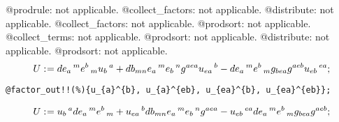 \documentclass[11pt]{article}
\def\specialcolon{\mathrel{\mathop{:}}\hspace{-.5em}}
\begin{document}
@prodrule: not applicable.
@collect\_factors: not applicable.
@distribute: not applicable.
@collect\_factors: not applicable.
@prodsort: not applicable.
@collect\_terms: not applicable.
@prodsort: not applicable.
@distribute: not applicable.
@prodsort: not applicable.
\begin{dmath*}[compact, spread=2pt]
U\specialcolon{}= {de}_{a}\,^{m} {e}^{b}\,_{m} {u}_{b}\,^{a} + {db}_{m n} {e}_{a}\,^{m} {e}_{b}\,^{n} {g}^{a ea} {u}_{ea}\,^{b} - {de}_{a}\,^{m} {e}^{b}\,_{m} {g}_{b ea} {g}^{a eb} {u}_{eb}\,^{ea};
\end{dmath*}
{\color[named]{Blue}\begin{verbatim}
@factor_out!!(%){u_{a}^{b}, u_{a}^{eb}, u_{ea}^{b}, u_{ea}^{eb}};
\end{verbatim}}
\begin{dmath*}[compact, spread=2pt]
U\specialcolon{}= {u}_{b}\,^{a} {de}_{a}\,^{m} {e}^{b}\,_{m} + {u}_{ea}\,^{b} {db}_{m n} {e}_{a}\,^{m} {e}_{b}\,^{n} {g}^{a ea} - {u}_{eb}\,^{ea} {de}_{a}\,^{m} {e}^{b}\,_{m} {g}_{b ea} {g}^{a eb};
\end{dmath*}
\end{document}

